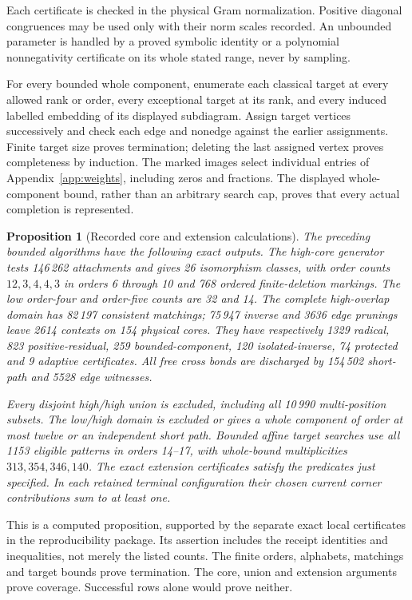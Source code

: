 \documentclass[11pt]{article}
\newtheorem{proposition}[theorem]{Proposition}
\theoremstyle{remark}\newtheorem{remark}[theorem]{Remark}
\begin{document}
Each certificate is checked in the physical Gram normalization.
Positive diagonal congruences may be used only with their norm
scales recorded. An unbounded parameter is handled by a proved
symbolic identity or a polynomial nonnegativity certificate on its
whole stated range, never by sampling.

For every bounded whole component, enumerate each classical target
at every allowed rank or order, every exceptional target at its rank,
and every induced labelled embedding of its displayed subdiagram.
Assign target vertices successively and check each edge and nonedge
against the earlier assignments. Finite target size proves termination;
deleting the last assigned vertex proves completeness by induction.
The marked images select individual entries of
Appendix~\ref{app:weights}, including zeros and fractions. The
displayed whole-component bound, rather than an arbitrary search cap,
proves that every actual completion is represented.

\begin{proposition}[Recorded core and extension calculations]
\label{prop:local-calculations}
The preceding bounded algorithms have the following exact outputs.
The high-core generator tests 146\,262 attachments and gives 26
isomorphism classes, with order counts $12,3,4,4,3$ in orders
6 through 10 and 768 ordered finite-deletion markings. The low
order-four and order-five counts are 32 and 14.
The complete high-overlap domain has 82\,197 consistent matchings;
75\,947 inverse and 3636 edge prunings leave 2614 contexts on
154 physical cores. They have respectively 1329 radical, 823
positive-residual, 259 bounded-component, 120 isolated-inverse,
74 protected and 9 adaptive certificates. All free cross bonds
are discharged by 154\,502 short-path and 5528 edge witnesses.

Every disjoint high/high union is excluded, including all
10\,990 multi-position subsets. The low/high domain is excluded
or gives a whole component of order at most twelve or an
independent short path. Bounded affine target searches use all
1153 eligible patterns in orders 14--17, with whole-bound
multiplicities $313,354,346,140$.
The exact extension certificates satisfy the predicates just
specified. In each retained terminal configuration their chosen
\emph{current} corner contributions sum to at least one.
\end{proposition}

This is a computed proposition, supported by the separate exact
local certificates in the reproducibility package. Its assertion
includes the receipt identities and inequalities, not merely the
listed counts. The finite orders, alphabets, matchings and target
bounds prove termination. The core, union and extension arguments
prove coverage. Successful rows alone would prove neither.
\end{document}
